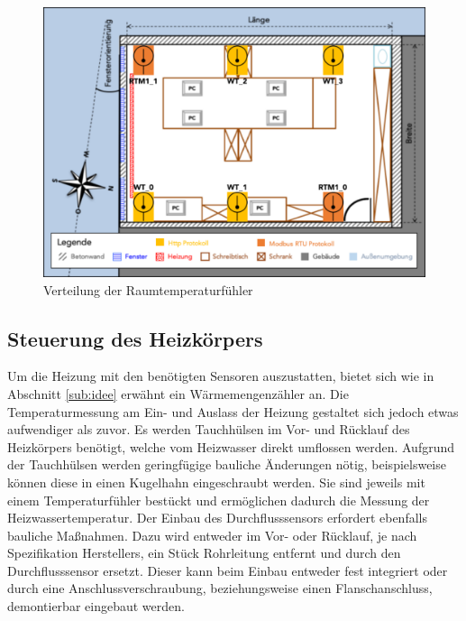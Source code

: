 \begin{figure}
\centering
\includegraphics[width=\textwidth]{abbildungen/20160324_sensors}
\caption{Verteilung der Raumtemperaturfühler}
\label{fig:raumtempsensors}
\end{figure}

\subsection{Steuerung des Heizkörpers}

Um die Heizung mit den benötigten Sensoren auszustatten, bietet sich wie in Abschnitt \ref{sub:idee} erwähnt ein Wärmemengenzähler an. Die Temperaturmessung am Ein- und Auslass der Heizung gestaltet sich jedoch etwas aufwendiger als zuvor. Es werden Tauchhülsen im Vor- und Rücklauf des Heizkörpers benötigt, welche vom Heizwasser direkt umflossen werden. Aufgrund der Tauchhülsen werden geringfügige bauliche Änderungen nötig, beispielsweise können diese in einen Kugelhahn eingeschraubt werden. Sie sind jeweils mit einem Temperaturfühler bestückt und ermöglichen dadurch die Messung der Heizwassertemperatur. Der Einbau des Durchflusssensors erfordert ebenfalls bauliche Maßnahmen. Dazu wird entweder im Vor- oder Rücklauf, je nach Spezifikation Herstellers, ein Stück Rohrleitung entfernt und durch den Durchflusssensor ersetzt. Dieser kann beim Einbau entweder fest integriert oder durch eine Anschlussverschraubung, beziehungsweise einen Flanschanschluss, demontierbar eingebaut werden.

